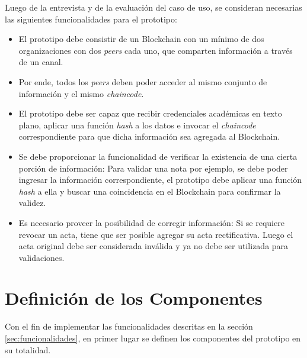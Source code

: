 Luego de la entrevista y de la evaluación del caso de uso, se consideran necesarias las siguientes funcionalidades para el prototipo:

\begin{itemize}
    \item El prototipo debe consistir de un Blockchain con un mínimo de dos organizaciones con dos \textit{peers} cada uno, que comparten información a través de un canal.
    \item Por ende, todos los \textit{peers} deben poder acceder al mismo conjunto de información y el mismo \textit{chaincode}.
    \item El prototipo debe ser capaz que recibir credenciales académicas en texto plano, aplicar una función \textit{hash} a los datos e invocar el \textit{chaincode} correspondiente para que dicha información sea agregada al Blockchain.
    \item Se debe proporcionar la funcionalidad de verificar la existencia de una cierta porción de información: Para validar una nota por ejemplo, se debe poder ingresar la información correspondiente, el prototipo debe aplicar una función \textit{hash} a ella y buscar una coincidencia en el Blockchain para confirmar la validez.
    \item Es necesario proveer la posibilidad de corregir información: Si se requiere revocar un acta, tiene que ser posible agregar su acta rectificativa. Luego el acta original debe ser considerada inválida y ya no debe ser utilizada para validaciones.
\end{itemize}

\section{Definición de los Componentes}

Con el fin de implementar las funcionalidades descritas en la sección \ref{sec:funcionalidades}, en primer lugar se definen los componentes del prototipo en su totalidad.

